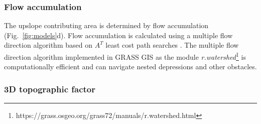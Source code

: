 \documentclass[esurf, manuscript]{copernicus}
\begin{document}

\subsubsection{Flow accumulation}

The upslope contributing area is determined by flow accumulation
(Fig.~\ref{fig:models}d). %
Flow accumulation is calculated using a multiple flow direction algorithm \citep{Metz2009} 
based on $A^{T}$ least cost path searches \citep{Ehlschlaeger1989}. 
The multiple flow direction algorithm 
implemented in GRASS GIS as the module 
\textit{r.watershed}\footnote{https://grass.osgeo.org/grass72/manuals/r.watershed.html}
is computationally efficient and can
navigate nested depressions and other obstacles. 



\subsubsection{3D topographic factor}
\end{document}

